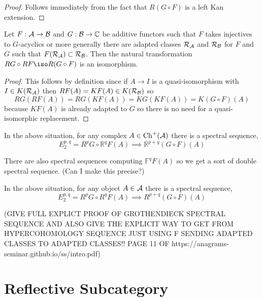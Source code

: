 \documentclass[12pt]{article}
\begin{document}
\begin{proof}
Follows immediately from the fact that $R(G \circ F)$ is a left Kan extension.
\end{proof}

\begin{lemma}
Let $F : \mathcal{A} \to \mathcal{B}$ and $G : \mathcal{B} \to \mathbb{C}$ be additive functors such that $F$ takes injectives to $G$-acyclics or more generally there are adapted classes $\mathcal{R}_{\mathcal{A}}$ and $\mathcal{R}_{\mathcal{B}}$ for $F$ and $G$ such that $F(\mathcal{R}_{\mathcal{A}}) \subset \mathcal{R}_{\mathcal{B}}$. Then the natural transformation $R G \circ R F \iso R(G \circ F)$ is an isomorphism.
\end{lemma}

\begin{proof}
This follows by definition since if $A \to I$ is a quasi-isomorphism with $I \in K(\mathcal{R}_{\mathcal{A}})$ then $RF(A) = KF(A) \in K(\mathcal{R}_{\mathcal{B}})$ so 
\[ RG(RF(A)) = RG(KF(A)) = KG(KF(A)) = K(G \circ F)(A) \]
because $KF(A)$ is already adapted to $G$ so there is no need for a quasi-isomorphic replacement.
\end{proof}

\begin{cor}
In the above situation, for any complex $A \in \mathrm{Ch}^+(\mathcal{A})$ there is a spectral sequence,
\[ E^{p,q}_2 = R^p G \circ \mathbb{R}^q F(A) \implies \mathbb{R}^{p+q}(G \circ F)(A) \]
\end{cor}

\begin{rmk}
There are also spectral sequences computing $\mathbb{F}^q F(A)$ so we get a sort of double spectral sequence. (Can I make this precise?)
\end{rmk}

\begin{cor}
In the above situation, for any object $A \in \mathcal{A}$ there is a spectral sequence,
\[ E^{p,q}_2 = R^p G \circ R^q F(A) \implies R^{p+q}(G \circ F)(A) \]
\end{cor}

\begin{rmk}
(GIVE FULL EXPLICT PROOF OF GROTHENDIECK SPECTRAL SEQUENCE AND ALSO GIVE THE EXPLICIT WAY TO GET FROM HYPERCOHOMOLOGY SEQUENCE JUST USING F SENDING ADAPTED CLASSES TO ADAPTED CLASSES!! PAGE 11 OF https://anagrams-seminar.github.io/ss/intro.pdf)
\end{rmk}

\section{Reflective Subcategory}
\end{document}
